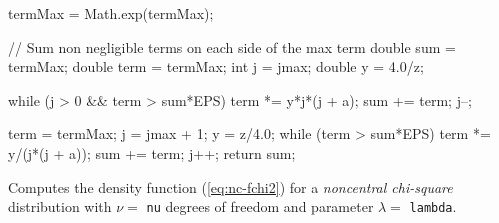 \begin{code}
\begin{hide}
{      termMax = Math.exp(termMax);

      // Sum non negligible terms on each side of the max term
      double sum = termMax;
      double term = termMax;
      int j = jmax;
      double y = 4.0/z;

      while (j > 0 && term > sum*EPS) {
         term *= y*j*(j + a);
         sum += term;
         j--;
      }

      term = termMax;
      j = jmax + 1;
      y = z/4.0;
      while (term > sum*EPS) {
         term *= y/(j*(j + a));
         sum += term;
         j++;
      }
      return sum;
   }\end{hide}
\end{code}
\begin{tabb} Computes the density function (\ref{eq:nc-fchi2}) for a
 {\em noncentral chi-square\/} distribution with $\nu = $ \texttt{nu} degrees
 of freedom and parameter  $\lambda = $ \texttt{lambda}.
\end{tabb}
